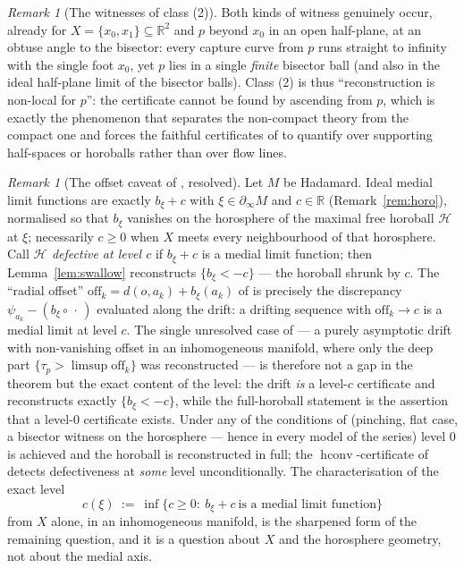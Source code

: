 \documentclass[11pt]{article}
\theoremstyle{remark}
\newtheorem{remark}[theorem]{Remark}
\newcommand{\R}{\mathbb{R}}
\newcommand{\X}{X}
\newcommand{\Hb}[1]{\mathcal{H}_{#1}}
\newcommand{\hconv}{\operatorname{hconv}}
\newcommand{\bdry}{\partial_{\infty}}
\begin{document}
\begin{remark}[The witnesses of class (2)]\label{rem:class2}
Both kinds of witness genuinely occur, already for
$\X=\{x_{0},x_{1}\}\subseteq\R^{2}$ and $p$ beyond $x_{0}$ in an open
half-plane, at an obtuse angle to the bisector: every capture curve
from $p$ runs straight to infinity with the single foot $x_{0}$, yet
$p$ lies in a single \emph{finite} bisector ball (and also in the
ideal half-plane limit of the bisector balls). Class (2) is thus
``reconstruction is non-local for $p$'': the certificate cannot be
found by ascending from $p$, which is exactly the phenomenon that
separates the non-compact theory from the compact one and forces the
faithful certificates of \cite{Bia,R2,R3} to quantify over supporting
half-spaces or horoballs rather than over flow lines.
\end{remark}

\begin{remark}[The offset caveat of \cite{R3}, resolved]
\label{rem:offset}
Let $M$ be Hadamard. Ideal medial limit functions are exactly
$b_{\xi}+c$ with $\xi\in\bdry M$ and $c\in\R$
(Remark~\ref{rem:horo}), normalised so that $b_{\xi}$ vanishes on the
horosphere of the maximal free horoball $\Hb{}$ at $\xi$; necessarily
$c\ge0$ when $\X$ meets every neighbourhood of that horosphere. Call
$\Hb{}$ \emph{defective at level $c$} if $b_{\xi}+c$ is a medial limit
function; then Lemma~\ref{lem:swallow} reconstructs
$\{b_{\xi}<-c\}$ --- the horoball shrunk by $c$. The
``radial offset'' $\mathrm{off}_{k}=d(o,a_{k})+b_{\xi}(a_{k})$ of
\cite[Thm.~3.4]{R3} is precisely the discrepancy
$\psi_{a_{k}}-(b_{\xi}\circ\,\cdot\,)$ evaluated along the drift:
a drifting sequence with $\mathrm{off}_{k}\to c$ is a medial limit at
level $c$. The single unresolved case of \cite[Thm.~3.4]{R3} --- a
purely asymptotic drift with non-vanishing offset in an inhomogeneous
manifold, where only the deep part
$\{\tau_{p}>\limsup\mathrm{off}_{k}\}$ was reconstructed --- is
therefore not a gap in the theorem but the exact content of the level:
the drift \emph{is} a level-$c$ certificate and reconstructs exactly
$\{b_{\xi}<-c\}$, while the full-horoball statement is the assertion
that a level-$0$ certificate exists. Under any of the conditions of
\cite[Thm.~3.4]{R3} (pinching, flat case, a bisector witness on the
horosphere --- hence in every model of the series) level $0$ is
achieved and the horoball is reconstructed in full; the
$\hconv$-certificate of \cite[Thm.~3.3--3.4]{R3} detects
defectiveness at \emph{some} level unconditionally. The
characterisation of the exact level
\[
  c(\xi)\ :=\ \inf\{c\ge0:\ b_{\xi}+c\ \text{is a medial limit
  function}\}
\]
from $\X$ alone, in an inhomogeneous manifold, is the sharpened form
of the remaining question, and it is a question about $\X$ and the
horosphere geometry, not about the medial axis.
\end{remark}
\end{document}
